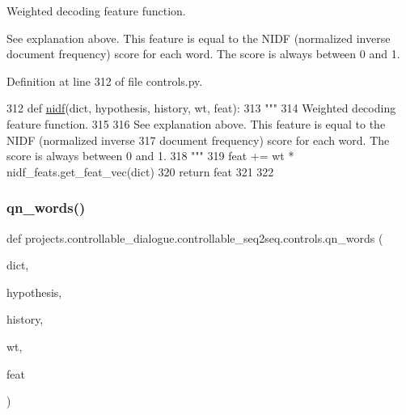 \begin{DoxyVerb}Weighted decoding feature function.

See explanation above. This feature is equal to the NIDF (normalized inverse
document frequency) score for each word. The score is always between 0 and 1.
\end{DoxyVerb}
 

Definition at line 312 of file controls.\+py.


\begin{DoxyCode}
312 \textcolor{keyword}{def }\hyperlink{namespaceprojects_1_1controllable__dialogue_1_1controllable__seq2seq_1_1controls_a27ef93e876c9c12b265bf2eefb65f058}{nidf}(dict, hypothesis, history, wt, feat):
313     \textcolor{stringliteral}{"""}
314 \textcolor{stringliteral}{    Weighted decoding feature function.}
315 \textcolor{stringliteral}{}
316 \textcolor{stringliteral}{    See explanation above. This feature is equal to the NIDF (normalized inverse}
317 \textcolor{stringliteral}{    document frequency) score for each word. The score is always between 0 and 1.}
318 \textcolor{stringliteral}{    """}
319     feat += wt * nidf\_feats.get\_feat\_vec(dict)
320     \textcolor{keywordflow}{return} feat
321 
322 
\end{DoxyCode}
\mbox{\label{namespaceprojects_1_1controllable__dialogue_1_1controllable__seq2seq_1_1controls_ac09ae7183b65c9bd1f6f1469db84012b}} 
\subsubsection{\texorpdfstring{qn\+\_\+words()}{qn\_words()}}
{\footnotesize\ttfamily def projects.\+controllable\+\_\+dialogue.\+controllable\+\_\+seq2seq.\+controls.\+qn\+\_\+words (\begin{DoxyParamCaption}\item[{}]{dict,  }\item[{}]{hypothesis,  }\item[{}]{history,  }\item[{}]{wt,  }\item[{}]{feat }\end{DoxyParamCaption})}

